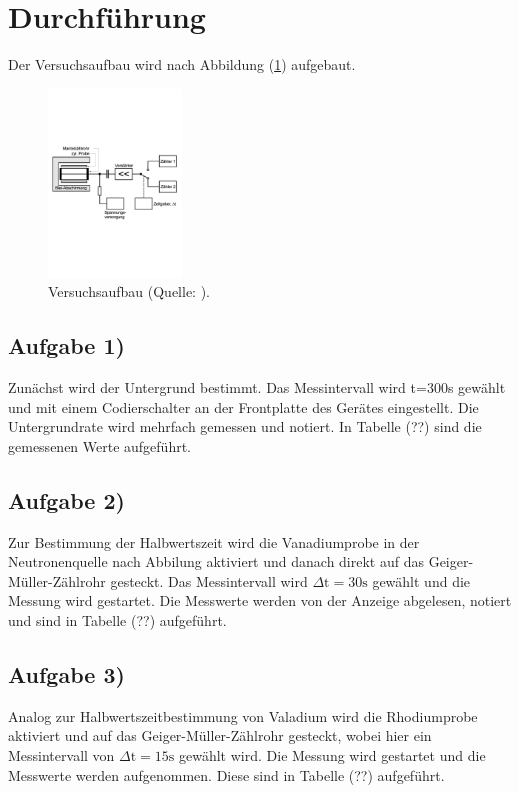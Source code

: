 \section{Durchführung}
Der Versuchsaufbau wird nach Abbildung (\ref{fig:aufbau}) aufgebaut.

\begin{figure}
            \centering
               \includegraphics[height=5cm]{aufbau.pdf}
               \caption{Versuchsaufbau (Quelle: \cite{V702}).}
               \label{fig:aufbau}
\end{figure}

\subsection{Aufgabe 1)}
\noindent
Zunächst wird der Untergrund bestimmt. 
Das Messintervall wird t=300s gewählt und mit einem Codierschalter an der Frontplatte des Gerätes eingestellt.
Die Untergrundrate wird mehrfach gemessen und notiert.
In Tabelle (??) sind die gemessenen Werte aufgeführt.

\subsection{Aufgabe 2)}
\noindent
Zur Bestimmung der Halbwertszeit wird die Vanadiumprobe in der Neutronenquelle nach Abbilung %
aktiviert und 
danach direkt auf das Geiger-Müller-Zählrohr gesteckt.
Das Messintervall wird $\Delta \text{t} = 30 \si{\second}$ gewählt und die Messung wird gestartet.
Die Messwerte werden von der Anzeige abgelesen, notiert und sind in Tabelle (??) aufgeführt.


\subsection{Aufgabe 3)}
Analog zur Halbwertszeitbestimmung von Valadium wird die Rhodiumprobe aktiviert und auf das Geiger-Müller-Zählrohr gesteckt,
wobei hier ein Messintervall von $\Delta \text{t} = 15 \si{\second}$ gewählt wird.
Die Messung wird gestartet und die Messwerte werden aufgenommen.
Diese sind in Tabelle (??) aufgeführt.